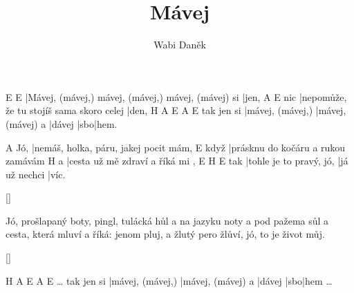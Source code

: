 \documentclass{song}
\title{Mávej}
\author{Wabi Daněk}
\begin{document}
E                                                  E\7
|Mávej, (mávej,) mávej, (mávej,) mávej, (mávej) si |jen,
    A                                        E
nic |nepomůže, že tu stojíš sama skoro celej |den,
           H\7              A                 E      A   E
tak jen si |mávej, (mávej,) |mávej, (mávej) a |dávej |sbo|hem.
\endstrophe

\strophe
    A
Jó, |nemáš, holka, páru, jakej pocit mám,
     E
když |prásknu do kočáru a rukou zamávám
  H\7
a |cesta už mě zdraví a říká mi ,
    E                       H\7           E
tak |tohle je to pravý, jó, |já už nechci |víc.
\endstrophe

\ref{}

\strophe*
Jó, prošlapaný boty, pingl, tulácká hůl
a na jazyku noty a pod pažema sůl
a cesta, která mluví a říká: jenom pluj,
a žlutý pero žlůví, jó, to je život můj.
\endstrophe

\ref{}

\strophe
                    H\7              A                 E      A   E
\ldots{} tak jen si |mávej, (mávej,) |mávej, (mávej) a |dávej |sbo|hem \ldots
\endstrophe
\end{document}
